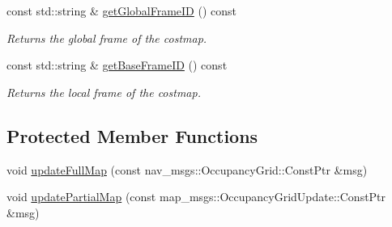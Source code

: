 \begin{DoxyCompactItemize}
const std\+::string \& \hyperlink{classexplore_1_1Costmap2DClient_a4e1fba13e2cdaeec2974edf00d1cbcbf}{get\+Global\+Frame\+ID} () const 
\begin{DoxyCompactList}\small\item\em Returns the global frame of the costmap. \end{DoxyCompactList}\item 
const std\+::string \& \hyperlink{classexplore_1_1Costmap2DClient_a8c57bfd0380791903e0ed175b6cf3076}{get\+Base\+Frame\+ID} () const 
\begin{DoxyCompactList}\small\item\em Returns the local frame of the costmap. \end{DoxyCompactList}\end{DoxyCompactItemize}
\subsection*{Protected Member Functions}
\begin{DoxyCompactItemize}
\item 
void \hyperlink{classexplore_1_1Costmap2DClient_aea42456429533a2d1b2534ba2a2a3c38}{update\+Full\+Map} (const nav\+\_\+msgs\+::\+Occupancy\+Grid\+::\+Const\+Ptr \&msg)
\item 
void \hyperlink{classexplore_1_1Costmap2DClient_a9ced9410da0b202133977a1ac30042bb}{update\+Partial\+Map} (const map\+\_\+msgs\+::\+Occupancy\+Grid\+Update\+::\+Const\+Ptr \&msg)
\end{DoxyCompactItemize}
